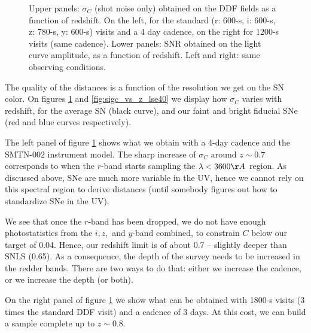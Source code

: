 \documentclass[\docopts]{\docclass}
\begin{document}
\begin{figure}
\begin{center}
\end{center}
\caption{Upper panels: $\sigma_C$ (shot noise only) obtained on the
  DDF fields as a function of redshift.  On the left, for the standard
  (r: 600-s, i: 600-s, z: 780-s, y: 600-s) visits and a 4 day cadence,
  on the right for 1200-s visits (same cadence). Lower panels: SNR
  obtained on the light curve amplitude, as a function of
  redshift. Left and right: same observing conditions.}
\label{fig:sigc_vs_z_smtn002}
\end{figure}

The quality of the distances is a function of the resolution we get on
the SN color.  On figures \ref{fig:sigc_vs_z_smtn002} and
\ref{fig:sigc_vs_z_lse40} we display how $\sigma_C$ varies with
redshift, for the average SN (black curve), and our faint and bright
fiducial SNe (red and blue curves respectively).  


The left panel of figure \ref{fig:sigc_vs_z_smtn002} shows what we
obtain with a 4-day cadence and the SMTN-002 instrument model.  The
sharp increase of $\sigma_C$ around $z \sim 0.7$ corresponds to when
the $r$-band starts sampling the $\lambda < 3600\AA$ region. As
discussed above, SNe are much more variable in the UV, hence we cannot
rely on this spectral region to derive distances (until somebody
figures out how to standardize SNe in the UV).

We see that once the $r$-band has been dropped, we do not have enough
photostatistics from the $i,z,$ and $y$-band combined, to constrain
$C$ below our target of 0.04.  Hence, our redshift limit is of about
0.7 -- slightly deeper than SNLS (0.65). As a consequence, the depth
of the survey needs to be increased in the redder bands. There are two
ways to do that: either we increase the cadence, or we increase the
depth (or both).

On the right panel of figure \ref{fig:sigc_vs_z_smtn002} we show what
can be obtained with 1800-s visits (3 times the standard DDF visit)
and a cadence of 3 days. At this cost, we can build a sample complete
up to $z \sim 0.8$. 
\end{document}
